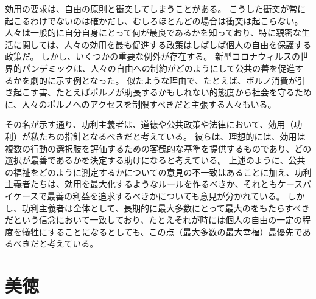 \documentclass[paper=a4,book,openany]{jlreq}
\begin{document}
効用の要求は、自由の原則と衝突してしまうことがある。
こうした衝突が常に起こるわけでないのは確かだし、むしろほとんどの場合は衝突は起こらない。
人々は一般的に自分自身にとって何が最良であるかを知っており、特に親密な生活に関しては、人々の効用を最も促進する政策はしばしば個人の自由を保護する政策だ。
しかし、いくつかの重要な例外が存在する。
新型コロナウィルスの世界的パンデミックは、人々の自由への制約がどのようにして公共の善を促進するかを劇的に示す例となった。
似たような理由で、たとえば、ポルノ消費が引き起こす害、たとえばポルノが助長するかもしれない的態度から社会を守るために、人々のポルノへのアクセスを制限すべきだと主張する人々もいる。

その名が示す通り、功利主義者は、道徳や公共政策や法律において、効用（功利）が私たちの指針となるべきだと考えている。
彼らは、理想的には、効用は複数の行動の選択肢を評価するための客観的な基準を提供するものであり、どの選択が最善であるかを決定する助けになると考えている。
上述のように、公共の福祉をどのように測定するかについての意見の不一致はあることに加え、功利主義者たちは、効用を最大化するようなルールを作るべきか、それともケースバイケースで最善の利益を追求するべきかについても意見が分かれている。
しかし、功利主義者は全体として、長期的に最大多数にとって最大のをもたらすべきだという信念において一致しており、たとえそれが時には個人の自由の一定の程度を犠牲にすることになるとしても、この点（最大多数の最大幸福）最優先であるべきだと考えている。

\section{美徳}
\end{document}
